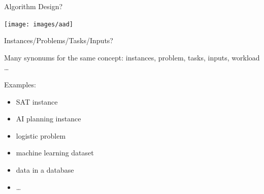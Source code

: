 \begin{frame}[c]{Algorithm Design?}

\centering
\texttt{[image: images/aad]}

\end{frame}
\begin{frame}[c]{Instances/Problems/Tasks/Inputs?}

Many synonums for the same concept: instances, problem, tasks, inputs, workload \ldots

Examples:

\begin{itemize}
  \item SAT instance
  \item AI planning instance
  \item logistic problem
  \item machine learning dataset
  \item data in a database
  \item \ldots
\end{itemize}


\end{frame}
